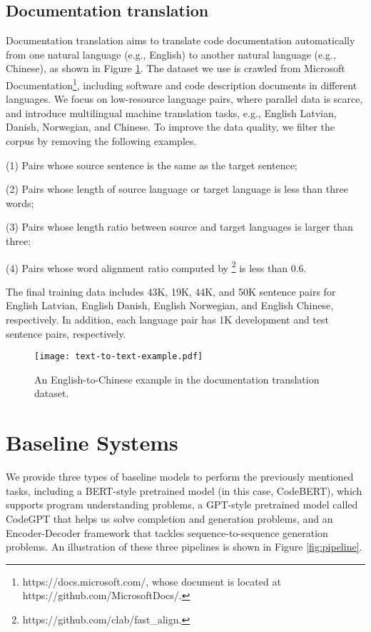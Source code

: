 \documentclass[sigconf,nonacm,screen]{acmart}
\begin{document}
\subsection{Documentation translation}
Documentation translation aims to translate code documentation automatically from one natural language (e.g., English) to another natural language (e.g., Chinese), as shown in Figure \ref{fig:text2text}.
The dataset we use is crawled  from Microsoft Documentation\footnote{https://docs.microsoft.com/, whose document is located at https://github.com/MicrosoftDocs/.}, including software and code description documents in different languages.
We focus on low-resource language pairs, where parallel
data is scarce, and introduce multilingual machine translation tasks, e.g., English  Latvian, Danish, Norwegian, and Chinese.
To improve the data quality, we filter the corpus by removing the following examples.

(1) Pairs whose source sentence is the same as the target sentence;

(2) Pairs whose length of source language or target language is less than three words;

(3) Pairs whose length ratio between source and target languages is larger than three; 

(4) Pairs whose word alignment ratio computed by \footnote{https://github.com/clab/fast\_align.} is less than 0.6. 

The final
training data includes 43K, 19K, 44K, and 50K sentence pairs for English  Latvian, English  Danish, English  Norwegian, and English  Chinese, respectively. In addition, each language pair has 1K development and test sentence pairs, respectively.

\begin{figure}[t]
    \texttt{[image: text-to-text-example.pdf]}
    \caption{An English-to-Chinese example in the documentation translation dataset.}
    \label{fig:text2text}
\end{figure}





\section{Baseline Systems}
We provide three types of baseline models to perform the  previously mentioned tasks, including a BERT-style pretrained model (in this case, CodeBERT), which supports program understanding problems,   a GPT-style pretrained model called CodeGPT that helps us solve completion and generation problems, and an Encoder-Decoder framework that tackles sequence-to-sequence generation problems. 
An illustration of these three pipelines is shown in Figure \ref{fig:pipeline}. 
\end{document}
